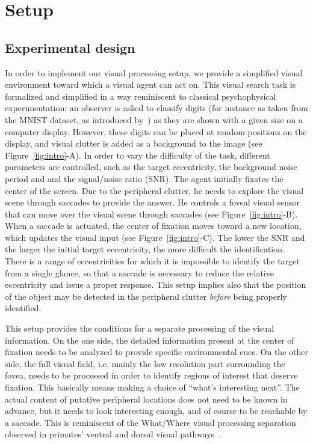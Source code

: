 \section{Setup}
\label{sec:principles}
\subsection{Experimental design}
In order to implement our visual processing setup, we provide a simplified visual environment toward which a visual agent can act on. This visual search task is formalized and simplified in a way reminiscent to classical psychophysical experimentation: an observer is asked to classify digits (for instance as taken from the MNIST dataset, as introduced by~\cite{Lecun1998}) as they are shown with a given size on a computer display. However, these digits can be placed at random positions on the display, and visual clutter is added as a background to the image (see Figure~\ref{fig:intro}-A). In order to vary the difficulty of the task, different parameters are controlled, such as the target eccentricity, the background noise period and and the signal/noise ratio (SNR).
The agent initially fixates the center of the screen. Due to the peripheral clutter, he needs to explore the visual scene through saccades to provide the answer. He controls a foveal visual sensor that can move over the visual scene through saccades (see Figure~\ref{fig:intro}-B). When a saccade is actuated, the center of fixation moves toward a new location, which updates the visual input (see Figure~\ref{fig:intro}-C).
The lower the SNR and the larger the initial target eccentricity, the more difficult the identification. There is a range of eccentricities for which it is impossible to identify the target from a single glance, so that a saccade is necessary to reduce the relative eccentricity and issue a proper response. This setup implies also that the position of the object may be detected in the peripheral clutter \emph{before} being properly identified.

This setup provides the conditions for a separate processing of the visual information. On the one side, the detailed information present at the center of fixation needs to be analyzed to provide specific environmental cues. On the other side, the full visual field, i.e. mainly the low resolution part surrounding the fovea, needs to be processed in order to identify regions of interest that deserve fixation. This basically means making a choice of “what’s interesting next”. The actual content of putative peripheral locations does not need to be known in advance, but it needs to look interesting enough, and of course to be reachable by a saccade. This is reminiscent of the What/Where visual processing separation observed in primates' ventral and dorsal visual pathways~\cite{mishkin1983object}.


